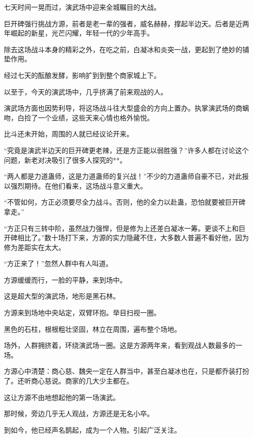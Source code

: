 
\begin{this_body}

七天时间一晃而过，演武场中迎来全城瞩目的大战。

巨开碑强行挑战方源，前者是老一辈的强者，威名赫赫，撑起半边天。后者是近两年崛起的新星，光芒闪耀，年轻一代的少年高手。

除去这场战斗本身的精彩之外，在吃之前，白凝冰和炎突一战，更起到了绝妙的铺垫作用。

经过七天的酝酿发酵，影响扩到到整个商家城上下。

以至于，今天的演武场中，几乎挤满了前来观战的人。

演武场方面也因势利导，将这场战斗往大型盛会的方向上置办。执掌演武场的商螭吻，白捡了一个业绩，这些天来心情也格外愉悦。

比斗还未开始，周围的人就已经议论开来。

“究竟是演武半边天的巨开碑更老辣，还是方正能以弱胜强？”许多人都在讨论这个问题，新老对决吸引了很多人探究的**。

“两人都是力道蛊师，这是力道蛊师的复兴战！”不少的力道蛊师自豪不已，对此报以强烈期待。在他们看来，这场战斗意义重大。

“不管如何，方正必须要尽全力战斗。否则，他的全力以赴蛊，恐怕就要被巨开碑拿走。”

“方正只有三转中阶，虽然战力强悍，但是修为上还差白凝冰一筹。更谈不上和巨开碑相比了。”数十场打下来，方源的实力隐藏不住，大多数人普遍不看好他，因为修为差距实在太大。

“方正来了！”忽然人群中有人叫道。

方源缓缓而行，一脸的平静，来到场中。

这是超大型的演武场，地形是黑石林。

方源来到场地中央站定，双臂环抱。举目扫视一圈。

黑色的石柱，根根粗壮坚固，林立在周围，遍布整个场地。

场外，人群拥挤着，环绕演武场一圈。这是方源两年来，看到观战人数最多的一场。

方源心中清楚：商心慈、魏央一定在人群当中，甚至白凝冰也在，只是都乔装打扮了。还听商心慈说。商家的几大少主都在。

这让方源不由地想起他的第一场演武。

那时候，旁边几乎无人观战，方源还是无名小卒。

到如今，他已经声名鹊起，成为一个人物。引起广泛关注。


\end{this_body}
